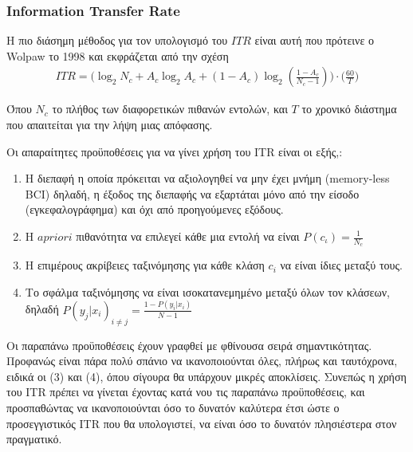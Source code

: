 \documentclass[11pt,a4paper,english,greek,twoside]{../Thesis}
\begin{document}
  \subsubsection{Information Transfer Rate}
  \par Η πιο διάσημη μέθοδος για τον υπολογισμό του $ITR$ είναι αυτή που πρότεινε ο Wolpaw το 1998 \cite{Wolpaw1998-yo} και εκφράζεται από την σχέση 
  \begin{align}
      ITR = \Big(\log_2N_c+A_c\log_2A_c+(1-A_c)\log_2(\frac{1-A_c}{N_c-1})\Big)\cdot\Big(\frac{60}{T}\Big)
  \end{align}
  \par Όπου $N_c$ το πλήθος των διαφορετικών πιθανών εντολών, και $T$ το χρονικό διάστημα που απαιτείται για την λήψη μιας απόφασης.
  \par Οι απαραίτητες προϋποθέσεις για να γίνει χρήση του ITR είναι οι εξής\cite{Wolpaw1998-yo},\cite{wolpaw2002brain}:
  \begin{enumerate}
      \item Η διεπαφή η οποία πρόκειται να αξιολογηθεί να μην έχει μνήμη (memory-less BCI) δηλαδή, η έξοδος της διεπαφής να εξαρτάται μόνο από την είσοδο (εγκεφαλογράφημα) και όχι από προηγούμενες εξόδους.
      \item Η $a priori$ πιθανότητα να επιλεγεί κάθε μια εντολή να είναι $P(c_ι) = \frac{1}{N_c}$
      \item Η επιμέρους ακρίβειες ταξινόμησης για κάθε κλάση $c_i$ να είναι ίδιες μεταξύ τους.
      \item Το σφάλμα ταξινόμησης να είναι ισοκατανεμημένο μεταξύ όλων τον κλάσεων, δηλαδή $P(y_j|x_i)_{i\neq j} = \frac{1-P(y_i|x_i)}{N-1}$
  \end{enumerate}
  \par Οι παραπάνω προϋποθέσεις έχουν γραφθεί με φθίνουσα σειρά σημαντικότητας. Προφανώς είναι πάρα πολύ σπάνιο να ικανοποιούνται όλες, πλήρως και ταυτόχρονα, ειδικά οι (3) και (4), όπου σίγουρα θα υπάρχουν μικρές αποκλίσεις. Συνεπώς η χρήση του ITR πρέπει να γίνεται έχοντας κατά νου τις παραπάνω προϋποθέσεις, και προσπαθώντας να ικανοποιούνται όσο το δυνατόν καλύτερα έτσι ώστε ο προσεγγιστικός ITR που θα υπολογιστεί, να είναι όσο το δυνατόν πλησιέστερα στον πραγματικό.
  
\end{document}
